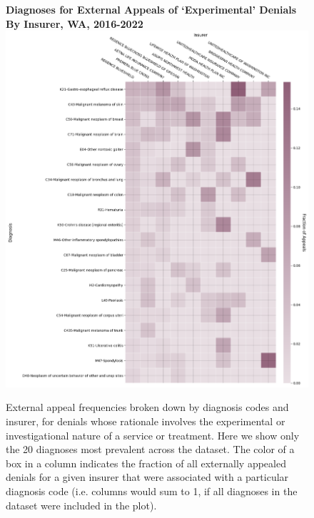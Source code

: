 \documentclass[12pt, a4paper,twoside]{report}
\theoremstyle{plain} %
\theoremstyle{definition} %
\theoremstyle{remark} %
\numberwithin{equation}{chapter}
\begin{document}
		\begin{figure}[h!]
			\centering
			\textbf{Diagnoses for External Appeals of `Experimental' Denials By Insurer, WA, 2016-2022}
			\includegraphics[width=.8\textwidth]{images/wa_external_appeals/experimental_diagnosis_by_insurer.png}
			\caption{External appeal frequencies broken down by diagnosis codes and insurer, for denials whose rationale involves the experimental or investigational nature of a service or treatment. Here we show only the 20 diagnoses most prevalent across the dataset. The color of a box in a column indicates the fraction of all externally appealed denials for a given insurer that were associated with a particular diagnosis code (i.e. columns would sum to 1, if all diagnoses in the dataset were included in the plot).}
			\label{waexpexternalappealsbydiagnosisinsurer}
		\end{figure}
		
\end{document}
